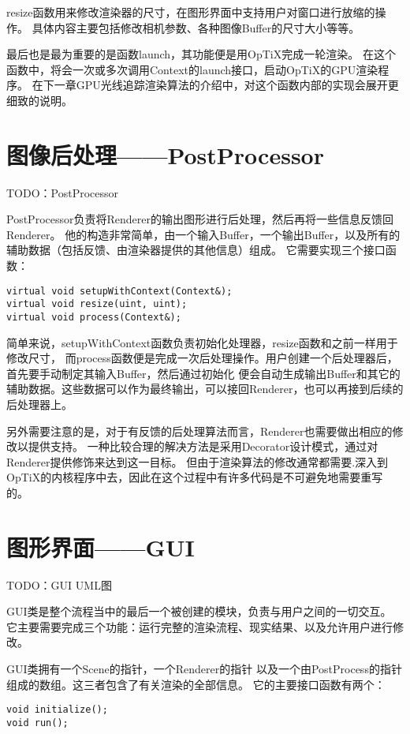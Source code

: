 resize函数用来修改渲染器的尺寸，在图形界面中支持用户对窗口进行放缩的操作。
具体内容主要包括修改相机参数、各种图像Buffer的尺寸大小等等。

最后也是最为重要的是函数launch，其功能便是用OpTiX完成一轮渲染。
在这个函数中，将会一次或多次调用Context的launch接口，启动OpTiX的GPU渲染程序。
在下一章GPU光线追踪渲染算法的介绍中，对这个函数内部的实现会展开更细致的说明。

\section{图像后处理——PostProcessor}

TODO：PostProcessor

PostProcessor负责将Renderer的输出图形进行后处理，然后再将一些信息反馈回Renderer。
他的构造非常简单，由一个输入Buffer，一个输出Buffer，以及所有的辅助数据（包括反馈、由渲染器提供的其他信息）组成。
它需要实现三个接口函数：

\lstset{language=C++}
\begin{lstlisting}
virtual void setupWithContext(Context&);
virtual void resize(uint, uint);
virtual void process(Context&);
\end{lstlisting}

简单来说，setupWithContext函数负责初始化处理器，resize函数和之前一样用于修改尺寸，
而process函数便是完成一次后处理操作。用户创建一个后处理器后，首先要手动制定其输入Buffer，然后通过初始化
便会自动生成输出Buffer和其它的辅助数据。这些数据可以作为最终输出，可以接回Renderer，也可以再接到后续的后处理器上。

另外需要注意的是，对于有反馈的后处理算法而言，Renderer也需要做出相应的修改以提供支持。
一种比较合理的解决方法是采用Decorator设计模式，通过对Renderer提供修饰来达到这一目标。
但由于渲染算法的修改通常都需要.深入到OpTiX的内核程序中去，因此在这个过程中有许多代码是不可避免地需要重写的。


\section{图形界面——GUI}

TODO：GUI UML图

GUI类是整个流程当中的最后一个被创建的模块，负责与用户之间的一切交互。
它主要需要完成三个功能：运行完整的渲染流程、现实结果、以及允许用户进行修改。

GUI类拥有一个Scene的指针，一个Renderer的指针
以及一个由PostProcess的指针组成的数组。这三者包含了有关渲染的全部信息。
它的主要接口函数有两个：
\lstset{language=C++}
\begin{lstlisting}
void initialize();
void run();
\end{lstlisting}

